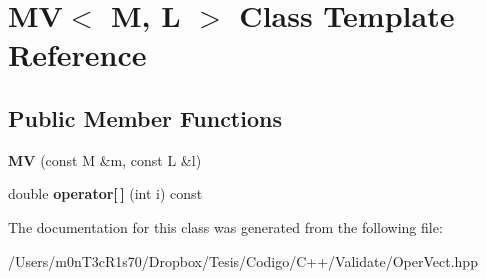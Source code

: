 \hypertarget{class_m_v}{}\section{MV$<$ M, L $>$ Class Template Reference}
\label{class_m_v}
\subsection*{Public Member Functions}
\begin{DoxyCompactItemize}
\item 
\hypertarget{class_m_v_acff6daf68e507c5ba5bd3c1bb9b29026}{}\label{class_m_v_acff6daf68e507c5ba5bd3c1bb9b29026} 
{\bfseries MV} (const M \&m, const L \&l)
\item 
\hypertarget{class_m_v_aefd327ec3c905bc145a8859bde7666b5}{}\label{class_m_v_aefd327ec3c905bc145a8859bde7666b5} 
double {\bfseries operator\mbox{[}$\,$\mbox{]}} (int i) const
\end{DoxyCompactItemize}


The documentation for this class was generated from the following file\+:\begin{DoxyCompactItemize}
\item 
/\+Users/m0n\+T3c\+R1s70/\+Dropbox/\+Tesis/\+Codigo/\+C++/\+Validate/Oper\+Vect.\+hpp\end{DoxyCompactItemize}
